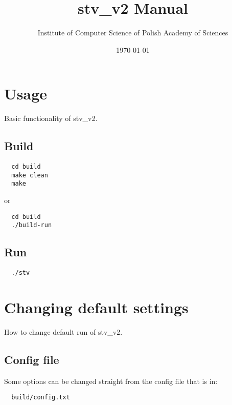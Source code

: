 \documentclass[12pt]{article}
\begin{document}
\title{stv\_v2 Manual}
\author{Institute of Computer Science of Polish Academy of Sciences}
\date{\today}
\maketitle
\vspace*{12cm}

\tableofcontents
{}
\hypersetup{pageanchor=true}

\newpage

\section{Usage}
Basic functionality of stv\_v2.

\subsection{Build}
\begin{lstlisting}
  cd build
  make clean
  make
\end{lstlisting}
or
\begin{lstlisting}
  cd build
  ./build-run
\end{lstlisting}

\subsection{Run}
\begin{lstlisting}
  ./stv
\end{lstlisting}

\section{Changing default settings}
How to change default run of stv\_v2.

\subsection{Config file}
Some options can be changed straight from the config file that is in:
\begin{lstlisting}
  build/config.txt
\end{lstlisting}

\bigbreak\bigbreak
\end{document}
